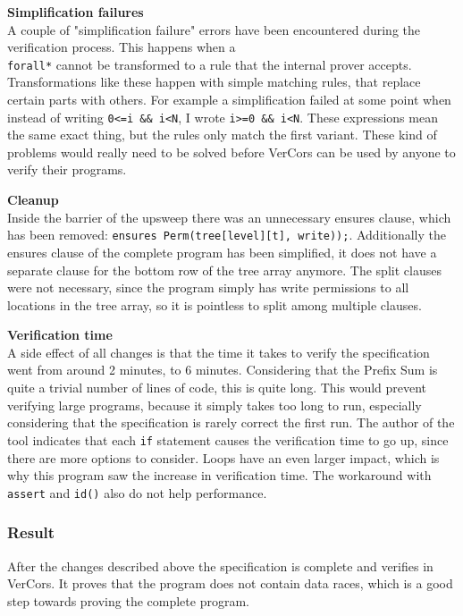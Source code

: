 \documentclass[a4paper]{article}
\newcommand{\code}[1]{\texttt{\small \color{inline}#1}} %
\begin{document}
\textbf{Simplification failures}\\
A couple of "simplification failure" errors have been encountered during the verification process. This happens when a \code{\\forall*} cannot be transformed to a rule that the internal prover accepts. Transformations like these happen with simple matching rules, that replace certain parts with others. For example a simplification failed at some point when instead of writing \code{0<=i \&\& i<N}, I wrote \code{i>=0 \&\& i<N}. These expressions mean the same exact thing, but the rules only match the first variant. These kind of problems would really need to be solved before VerCors can be used by anyone to verify their programs.

\textbf{Cleanup}\\
Inside the barrier of the upsweep there was an unnecessary ensures clause, which has been removed: \code{ensures Perm(tree[level][t], write));}.
Additionally the ensures clause of the complete program has been simplified, it does not have a separate clause for the bottom row of the tree array anymore. The split clauses were not necessary, since the program simply has write permissions to all locations in the tree array, so it is pointless to split among multiple clauses.

\textbf{Verification time}\\
A side effect of all changes is that the time it takes to verify the specification went from around 2 minutes, to 6 minutes. Considering that the Prefix Sum is quite a trivial number of lines of code, this is quite long. This would prevent verifying large programs, because it simply takes too long to run, especially considering that the specification is rarely correct the first run. The author of the tool indicates that each \code{if} statement causes the verification time to go up, since there are more options to consider. Loops have an even larger impact, which is why this program saw the increase in verification time. The workaround with \code{assert} and \code{id()} also do not help performance.

\subsubsection{Result}
After the changes described above the specification is complete and verifies in VerCors. It proves that the program does not contain data races, which is a good step towards proving the complete program.
\end{document}
